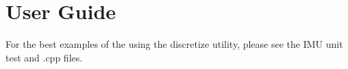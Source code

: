 \section{User Guide}
For the best examples of the using the discretize utility, please see the IMU unit test and .cpp files. 